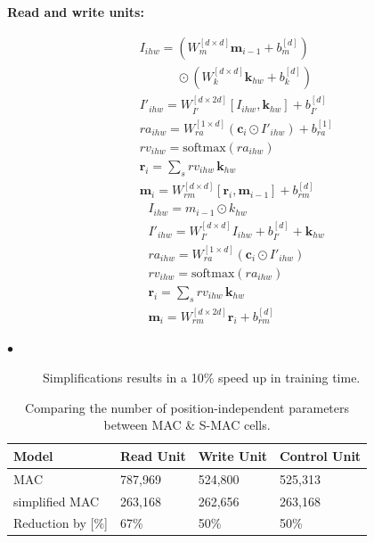 \documentclass[final,paperwidth=36in,paperheight=48in,portrait,fontscale=0.36]{baposter}
\newcommand{\cc}{\mathbf{c}}
\newcommand{\kb}{\mathbf{k}}
\newcommand{\mem}{\mathbf{m}}
\newcommand{\rr}{\mathbf{r}}
\begin{document}
\begin{poster}
{\noindent\textbf{Read and write units:}
\begin{multicols}{2}
	\noindent
	\begin{align*}
	&I_{ihw} = (W_{m}^{[d \times d]} \mem_{i-1} + b_{m}^{[d]}) \\
	& \qquad \quad \odot (W_{k}^{[d \times d]} \kb_{hw} + b_{k}^{[d]}) \tag{r1} \\
	&I'_{ihw} =  W_{I'}^{[d \times 2d]} [I_{ihw},\kb_{hw}]  + b_{I'}^{[d]}  \tag{r2} \\
	&ra_{ihw} = W_{ra}^{[1 \times d]} (\cc_i \odot I'_{ihw}) + b_{ra}^{[1]} \tag{r3.1}\\
	&rv_{ihw} = \textrm{softmax}(ra_{ihw}) \tag{r3.2}\\
	&\rr_i = \sum_s rv_{ihw} \, \kb_{hw}  \tag{r3.3}\\
	&\mem_i = W_{rm}^{[d \times d]} [\rr_i, \mem_{i-1}]  + b_{rm}^{[d]} \tag{w1}	
	\end{align*}
	\columnbreak
	{
		\begin{align*}
		&I_{ihw} = m _{i-1} \odot k _{hw} \tag{r1} \\ 
		&I'_{ihw} = W_{I'}^{[d \times d]} I_{ihw} + b_{I'}^{[d]} + \kb_{hw} \tag{r2} \\
		&ra_{ihw} = W_{ra}^{[1 \times d]} (\cc_i \odot I'_{ihw})  \tag{r3.1}\\
		&rv_{ihw} = \textrm{softmax}(ra_{ihw}) \tag{r3.2}\\
		&\rr_i = \sum_s rv_{ihw} \, \kb_{hw}  \tag{r3.3}\\
		&\mem_i = W_{rm}^{[d \times 2d]} \rr_i + b_{rm}^{[d]} \tag{w1}
		\end{align*}}
\end{multicols}



\begin{description}
	
	\item[$\bullet$] Simplifications results in a 10\% speed up in training time.
	
\end{description}

	
\begin{table}[H]
	\centering
	\caption{Comparing the number of position-independent parameters between MAC \& S-MAC cells.}
	\begin{tabular}{llll}
		\toprule
		Model        & Read Unit               & Write Unit &  Control Unit         \\
		\midrule
		MAC   &  787,969 &  524,800        &    525,313    \\
		simplified MAC & 263,168  & 262,656       &    263,168 \\
		\midrule
		Reduction by [\%]  & 67\%  &   50\%       &      50\%  \\
		\bottomrule
	\end{tabular}
	\label{tab:data_properties}
\end{table}

}
\end{poster}
\end{document}
